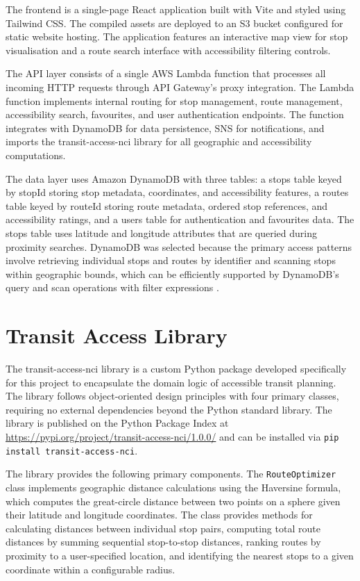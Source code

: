 \documentclass[conference]{IEEEtran}
\begin{document}
The frontend is a single-page React application built with Vite and styled using Tailwind CSS. The compiled assets are deployed to an S3 bucket configured for static website hosting. The application features an interactive map view for stop visualisation and a route search interface with accessibility filtering controls.

The API layer consists of a single AWS Lambda function that processes all incoming HTTP requests through API Gateway's proxy integration. The Lambda function implements internal routing for stop management, route management, accessibility search, favourites, and user authentication endpoints. The function integrates with DynamoDB for data persistence, SNS for notifications, and imports the transit-access-nci library for all geographic and accessibility computations.

The data layer uses Amazon DynamoDB with three tables: a stops table keyed by stopId storing stop metadata, coordinates, and accessibility features, a routes table keyed by routeId storing route metadata, ordered stop references, and accessibility ratings, and a users table for authentication and favourites data. The stops table uses latitude and longitude attributes that are queried during proximity searches. DynamoDB was selected because the primary access patterns involve retrieving individual stops and routes by identifier and scanning stops within geographic bounds, which can be efficiently supported by DynamoDB's query and scan operations with filter expressions \cite{awsdynamodb}.

\section{Transit Access Library}

The transit-access-nci library is a custom Python package developed specifically for this project to encapsulate the domain logic of accessible transit planning. The library follows object-oriented design principles with four primary classes, requiring no external dependencies beyond the Python standard library. The library is published on the Python Package Index at \url{https://pypi.org/project/transit-access-nci/1.0.0/} and can be installed via \texttt{pip install transit-access-nci}.

The library provides the following primary components. The \texttt{RouteOptimizer} class implements geographic distance calculations using the Haversine formula, which computes the great-circle distance between two points on a sphere given their latitude and longitude coordinates. The class provides methods for calculating distances between individual stop pairs, computing total route distances by summing sequential stop-to-stop distances, ranking routes by proximity to a user-specified location, and identifying the nearest stops to a given coordinate within a configurable radius.
\end{document}
